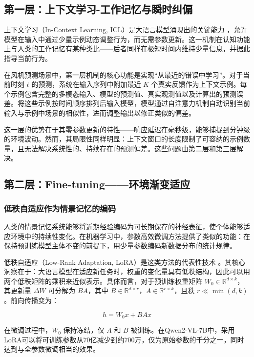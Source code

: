 \documentclass[12pt,a4paper]{article}
\begin{document}
\subsection{第一层：上下文学习-工作记忆与瞬时纠偏}

上下文学习（In-Context Learning, ICL）是大语言模型涌现出的关键能力 \cite{brown2020language}，允许模型在输入中通过少量示例动态调整行为，而无需参数更新。这一机制在认知功能上与人类的工作记忆有某种类比——后者同样在极短时间内维持少量信息，并据此指导当前行为。

在风机预测场景中，第一层机制的核心功能是实现“从最近的错误中学习”。对于当前时刻 $t$ 的预测，系统在输入序列中附加最近 $K$ 个真实反馈作为上下文示例。每个示例包含完整的多模态输入、模型的预测值、真实观测值以及计算出的预测误差。将这些示例按时间顺序排列后输入模型，模型通过自注意力机制自动识别当前输入与示例中场景的相似性，进而调整输出以修正类似的偏差。

这一层的优势在于其零参数更新的特性——响应延迟在毫秒级，能够捕捉到分钟级的环境波动。然而，其局限性同样明显：上下文窗口的长度限制了可容纳的示例数量，且无法解决系统性的、持续存在的预测偏差。这些问题由第二层和第三层解决。

\subsection{第二层：Fine-tuning——环境渐变适应}

\subsubsection{低秩自适应作为情景记忆的编码}

人类的情景记忆系统能够将近期经验编码为可长期保存的神经表征，使个体能够适应环境中的持续性变化。在机器学习中，参数高效微调方法提供了类似的功能：在保持预训练模型主体不变的前提下，用少量参数编码新数据分布的统计规律。

低秩自适应（Low-Rank Adaptation, LoRA）是这类方法的代表性技术 \cite{hu2022lora}。其核心洞察在于：大语言模型在适应新任务时，权重的变化量具有低秩结构，因此可以用两个低秩矩阵的乘积来近似表示。具体而言，对于预训练权重矩阵 $W_0 \in \mathbb{R}^{d \times k}$，其更新量 $\Delta W$ 可分解为 $BA$，其中 $B \in \mathbb{R}^{d \times r}$，$A \in \mathbb{R}^{r \times k}$，且秩 $r \ll \min(d,k)$。前向传播变为：

\begin{equation}
h = W_0 x + BA x
\end{equation}

在微调过程中，$W_0$ 保持冻结，仅 $A$ 和 $B$ 被训练。在Qwen2-VL-7B中，采用LoRA可以将可训练参数从70亿减少到约700万，仅为原始参数的千分之一，同时达到与全参数微调相当的效果。
\end{document}

